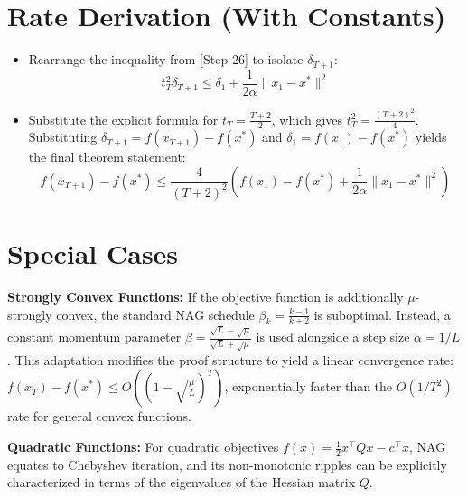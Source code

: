 \documentclass[11pt]{article}
\begin{document}
\section*{Rate Derivation (With Constants)}
\begin{itemize}
    \item[{[Step 27]}] Rearrange the inequality from [Step 26] to isolate $\delta_{T+1}$:
    $$t_T^2 \delta_{T+1} \le \delta_1 + \frac{1}{2\alpha} \|x_1 - x^*\|^2$$
    
    \item[{[Step 28]}] Substitute the explicit formula for $t_T = \frac{T+2}{2}$, which gives $t_T^2 = \frac{(T+2)^2}{4}$. Substituting $\delta_{T+1} = f(x_{T+1}) - f(x^*)$ and $\delta_1 = f(x_1) - f(x^*)$ yields the final theorem statement:
    $$f(x_{T+1}) - f(x^*) \le \frac{4}{(T+2)^2} \left( f(x_1) - f(x^*) + \frac{1}{2\alpha} \|x_1 - x^*\|^2 \right)$$
\end{itemize}

\section*{Special Cases}
\textbf{Strongly Convex Functions:} 
If the objective function is additionally $\mu$-strongly convex, the standard NAG schedule $\beta_k = \frac{k-1}{k+2}$ is suboptimal. Instead, a constant momentum parameter $\beta = \frac{\sqrt{L} - \sqrt{\mu}}{\sqrt{L} + \sqrt{\mu}}$ is used alongside a step size $\alpha = 1/L$. This adaptation modifies the proof structure to yield a linear convergence rate: $f(x_T) - f(x^*) \le O\left( \left(1 - \sqrt{\frac{\mu}{L}}\right)^T \right)$, exponentially faster than the $O(1/T^2)$ rate for general convex functions.

\textbf{Quadratic Functions:}
For quadratic objectives $f(x) = \frac{1}{2}x^\top Q x - c^\top x$, NAG equates to Chebyshev iteration, and its non-monotonic ripples can be explicitly characterized in terms of the eigenvalues of the Hessian matrix $Q$.
\end{document}
